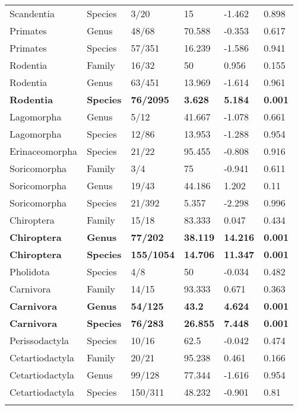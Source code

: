 \begin{longtable}{llllll}
  Scandentia & Species & 3/20 & 15 & -1.462 & 0.898 \\ 
  Primates & Genus & 48/68 & 70.588 & -0.353 & 0.617 \\ 
  Primates & Species & 57/351 & 16.239 & -1.586 & 0.941 \\ 
  Rodentia & Family & 16/32 & 50 & 0.956 & 0.155 \\ 
  Rodentia & Genus & 63/451 & 13.969 & -1.614 & 0.961 \\ 
  \textbf{Rodentia} & \textbf{Species} & \textbf{76/2095} & \textbf{3.628} & \textbf{5.184} & \textbf{0.001} \\ 
  Lagomorpha & Genus & 5/12 & 41.667 & -1.078 & 0.661 \\ 
  Lagomorpha & Species & 12/86 & 13.953 & -1.288 & 0.954 \\ 
  Erinaceomorpha & Species & 21/22 & 95.455 & -0.808 & 0.916 \\ 
  Soricomorpha & Family & 3/4 & 75 & -0.941 & 0.611 \\ 
  Soricomorpha & Genus & 19/43 & 44.186 & 1.202 & 0.11 \\ 
  Soricomorpha & Species & 21/392 & 5.357 & -2.298 & 0.996 \\ 
  Chiroptera & Family & 15/18 & 83.333 & 0.047 & 0.434 \\ 
  \textbf{Chiroptera} & \textbf{Genus} & \textbf{77/202} & \textbf{38.119} & \textbf{14.216} & \textbf{0.001} \\ 
  \textbf{Chiroptera} & \textbf{Species} & \textbf{155/1054} & \textbf{14.706} & \textbf{11.347} & \textbf{0.001} \\ 
  Pholidota & Species & 4/8 & 50 & -0.034 & 0.482 \\ 
  Carnivora & Family & 14/15 & 93.333 & 0.671 & 0.363 \\ 
  \textbf{Carnivora} & \textbf{Genus} & \textbf{54/125} & \textbf{43.2} & \textbf{4.624} & \textbf{0.001} \\ 
  \textbf{Carnivora} & \textbf{Species} & \textbf{76/283} & \textbf{26.855} & \textbf{7.448} & \textbf{0.001} \\ 
  Perissodactyla & Species & 10/16 & 62.5 & -0.042 & 0.474 \\ 
  Cetartiodactyla & Family & 20/21 & 95.238 & 0.461 & 0.166 \\ 
  Cetartiodactyla & Genus & 99/128 & 77.344 & -1.616 & 0.954 \\ 
  Cetartiodactyla & Species & 150/311 & 48.232 & -0.901 & 0.81 \\ 
   \hline
\hline
\label{Supp_data_structureNRI_threshold1}
\end{longtable}
